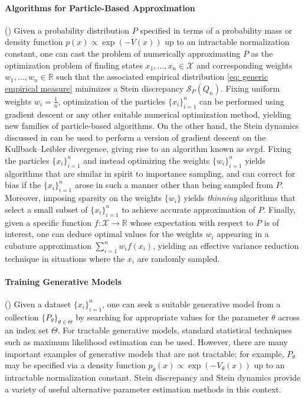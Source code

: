 \documentclass[12pt,paper=letter]{scrreprt}
\begin{document}
\paragraph{Algorithms for Particle-Based Approximation} ()  
Given a probability distribution $P$ specified in terms of a probability mass or density function $p(x) \propto \exp(-V(x))$ up to an intractable normalization constant, one can cast the problem of numerically approximating $P$ as the optimization problem of finding states $x_1,\dots,x_n \in \mathcal{X}$ and corresponding weights $w_1,\dots,w_n \in \mathbb{R}$ such that the associated empirical distribution \eqref{eq: generic empirical measure} minimizes a Stein discrepancy $\mathcal{S}_P(Q_n)$.
Fixing uniform weights $w_i = \frac{1}{n}$,  optimization of the particles $\{x_i\}_{i=1}^n$ can be performed using gradient descent or any other suitable numerical optimization method, yielding new families of particle-based algorithms.
On the other hand, the Stein dynamics discussed in  can be used to perform a version of gradient descent on the Kullback--Leibler divergence, giving rise to an algorithm known as \ac{svgd}.
Fixing the particles $\{x_i\}_{i=1}^n$ and instead optimizing the weights $\{w_i\}_{i=1}^n$ yields algorithms that are similar in spirit to importance sampling, and can correct for bias if the $\{x_i\}_{i=1}^n$ arose in such a manner other than being sampled from $P$.  
Moreover, imposing sparsity on the weights $\{w_i\}$ yields \emph{thinning} algorithms that select a small subset of $\{x_i\}_{i=1}^n$ to achieve accurate approximation of $P$. 
Finally, given a specific function $f : \mathcal{X} \rightarrow \mathbb{R}$ whose expectation with respect to $P$ is of interest, one can deduce optimal values for the weights $w_i$ appearing in a cubature approximation $\sum_{i=1}^n w_i f(x_i)$, yielding an effective variance reduction technique in situations where the $x_i$ are randomly sampled.




\paragraph{Training Generative Models} 
()
Given a dataset $\{x_i\}_{i=1}^n$, one can seek a suitable generative model from a collection $\{P_\theta\}_{\theta \in \Theta}$ by searching for appropriate values for the parameter $\theta$ across an index set $\Theta$.
For tractable generative models, standard statistical techniques such as maximum likelihood estimation can be used.
However, there are many important examples of generative models that are not tractable; for example, $P_\theta$ may be specified via a density function $p_\theta(x) \propto \exp(-V_\theta(x))$ up to an intractable normalization constant.
Stein discrepancy and Stein dynamics provide a variety of useful alternative parameter estimation methods in this context.
\end{document}
